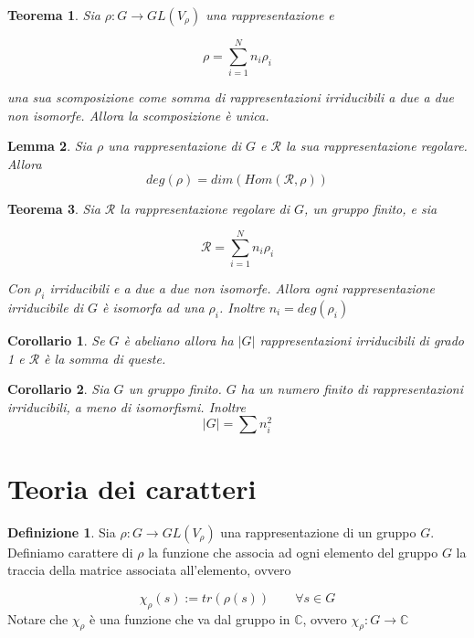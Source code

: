 \documentclass[11pt]{article}
\theoremstyle{plain}
\newtheorem{thm}{Teorema}[section]
\newtheorem{lemma}[thm]{Lemma}
\newtheorem*{cor}{Corollario}
\theoremstyle{definition}
\newtheorem{defn}{Definizione}[section]
\theoremstyle{remark}
\newcommand{\C}{\mathbb{C}}
\newcommand{\dsum}{\displaystyle\sum}
\begin{document}
\begin{thm}
Sia $\rho: G \to GL(V_\rho)$ una rappresentazione e 

\[\rho = \dsum_{i=1}^N n_i \rho_i \]

una sua scomposizione come somma di rappresentazioni irriducibili a due a due non isomorfe. Allora la scomposizione è unica.
\end{thm}



\begin{lemma}
Sia $\rho$ una rappresentazione di $G$ e $\mathcal{R}$ la sua rappresentazione regolare. Allora 
\[deg(\rho) = dim(Hom(\mathcal{R}, \rho))\]
\end{lemma}




\begin{thm}
Sia $\mathcal{R}$ la rappresentazione regolare di $G$, un gruppo finito, e sia 

\[ \mathcal{R} = \dsum_{i=1}^Nn_i \rho_i\]

Con $\rho_i$ irriducibili e a due a due non isomorfe. Allora ogni rappresentazione irriducibile di $G$ è isomorfa ad una $\rho_i$. Inoltre $n_i = deg(\rho_i)$ 
\label{thm: teorema importantissimo}
\end{thm}



\begin{cor}
Se $G$ è abeliano allora ha $|G|$ rappresentazioni irriducibili di grado 1 e $\mathcal{R}$ è la somma di queste.
\end{cor}



\begin{cor}
Sia $G$ un gruppo finito. $G$ ha un numero finito di rappresentazioni irriducibili, a meno di isomorfismi. Inoltre
\[|G| = \dsum n_i^2\]
\end{cor}



















\newpage
\section{Teoria dei caratteri}


\begin{defn}
Sia $\rho: G \to GL(V_\rho)$ una rappresentazione di un gruppo $G$. Definiamo carattere di $\rho$ la funzione che associa ad ogni elemento del gruppo $G$ la traccia della matrice associata all'elemento, ovvero

\[\chi_\rho(s) := tr (\rho(s)) \qquad \forall s \in G \]
Notare che $\chi_{\rho}$ è una funzione che va dal gruppo in $\C$, ovvero $\chi_{\rho}: G \to \C$

\end{defn}
\end{document}
